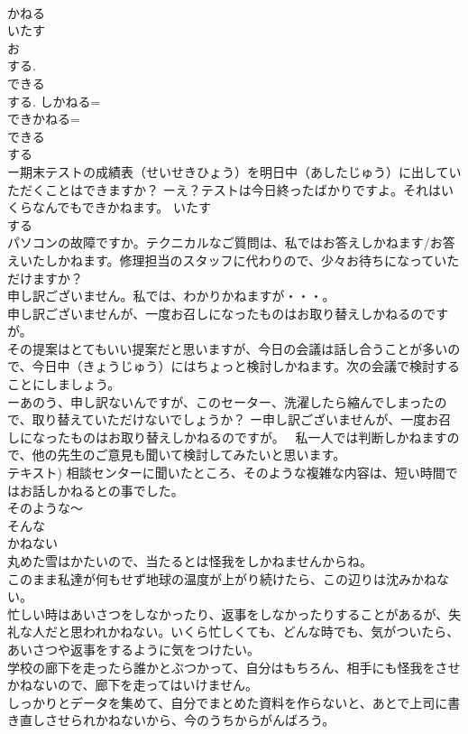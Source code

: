 \documentclass[8pt]{extreport}
\begin{document}
\begin{CJK}{UTF8}{min}
\\	かねる 
\\	いたす 
\\	お
\\	する. 
\\	できる 
\\	する. しかねる=
\\	できかねる=
\\	できる 
\\	する 
\\	ー期末テストの成績表（せいせきひょう）を明日中（あしたじゅう）に出していただくことはできますか？ ーえ？テストは今日終ったばかりですよ。それはいくらなんでもできかねます。 いたす 
\\	する 
\\	パソコンの故障ですか。テクニカルなご質問は、私ではお答えしかねます/お答えいたしかねます。修理担当のスタッフに代わりので、少々お待ちになっていただけますか？ 
\\	申し訳ございません。私では、わかりかねますが・・・。 
\\	申し訳ございませんが、一度お召しになったものはお取り替えしかねるのですが。 
\\	その提案はとてもいい提案だと思いますが、今日の会議は話し合うことが多いので、今日中（きょうじゅう）にはちょっと検討しかねます。次の会議で検討することにしましょう。 
\\	ーあのう、申し訳ないんですが、このセーター、洗濯したら縮んでしまったので、取り替えていただけないでしょうか？ ー申し訳ございませんが、一度お召しになったものはお取り替えしかねるのですが。　 私一人では判断しかねますので、他の先生のご意見も聞いて検討してみたいと思います。 
\\	テキスト) 相談センターに聞いたところ、そのような複雑な内容は、短い時間ではお話しかねるとの事でした。 
\\	そのような～ 
\\	そんな
\\	かねない 
\\	丸めた雪はかたいので、当たるとは怪我をしかねませんからね。 
\\	このまま私達が何もせず地球の温度が上がり続けたら、この辺りは沈みかねない。 
\\	忙しい時はあいさつをしなかったり、返事をしなかったりすることがあるが、失礼な人だと思われかねない。いくら忙しくても、どんな時でも、気がついたら、あいさつや返事をするように気をつけたい。 
\\	学校の廊下を走ったら誰かとぶつかって、自分はもちろん、相手にも怪我をさせかねないので、廊下を走ってはいけません。 
\\	しっかりとデータを集めて、自分でまとめた資料を作らないと、あとで上司に書き直しさせられかねないから、今のうちからがんばろう。 

\end{CJK}
\end{document}
